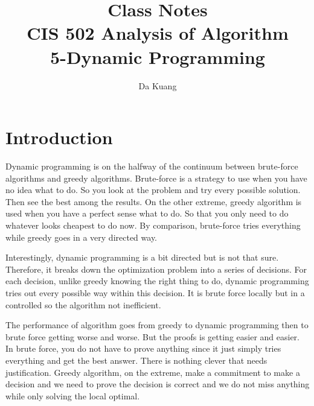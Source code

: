 \documentclass[en,hazy,blue,screen,14pt]{elegantnote}
\title{Class Notes\\CIS 502 Analysis of Algorithm\\5-Dynamic Programming}
\author{Da Kuang}
\institute{University of Pennsylvania}
\date{}
\begin{document}
\maketitle
\newpage
% 
\section{Introduction}
Dynamic programming is on the halfway of the continuum between brute-force algorithms and greedy algorithms. Brute-force is a strategy to use when you have no idea what to do. So you look at the problem and try every possible solution. Then see the best among the results. On the other extreme, greedy algorithm is used when you have a perfect sense what to do. So that you only need to do whatever looks cheapest to do now. By comparison, brute-force tries everything while greedy goes in a very directed way.

Interestingly, dynamic programming is a bit directed but is not that sure. Therefore, it breaks down the optimization problem into a series of decisions. For each decision, unlike greedy knowing the right thing to do, dynamic programming tries out every possible way within this decision. It is brute force locally but in a controlled so the algorithm not inefficient.

The performance of algorithm goes from greedy to dynamic programming then to brute force getting worse and worse. But the proofs is getting easier and easier. In brute force, you do not have to prove anything since it just simply tries everything and get the best answer. There is nothing clever that needs justification. Greedy algorithm, on the extreme, make a commitment to make a decision and we need to prove the decision is correct and we do not miss anything while only solving the local optimal.
\end{document}
